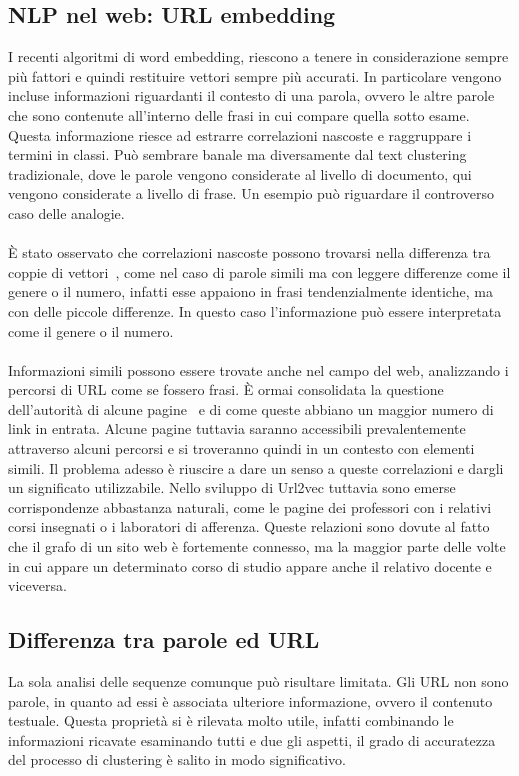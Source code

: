 \subsection{NLP nel web: URL embedding}
I recenti algoritmi di word embedding, riescono a tenere in considerazione sempre più fattori e quindi restituire vettori sempre più accurati. In particolare vengono incluse informazioni riguardanti il contesto di una parola, ovvero le altre parole che sono contenute all'interno delle frasi in cui compare quella sotto esame. Questa informazione riesce ad estrarre correlazioni nascoste e raggruppare i termini in classi. Può sembrare banale ma diversamente dal text clustering tradizionale, dove le parole vengono considerate al livello di documento, qui vengono considerate a livello di frase. Un esempio può riguardare il controverso caso delle analogie. 
\\\\
È stato osservato che correlazioni nascoste possono trovarsi nella differenza tra coppie di vettori~\cite{Mikolov13}, come nel caso di parole simili ma con leggere differenze come il genere o il numero, infatti esse appaiono in frasi tendenzialmente identiche, ma con delle piccole differenze. In questo caso l'informazione può essere interpretata come il genere o il numero.
\\\\
Informazioni simili possono essere trovate anche nel campo del web, analizzando i percorsi di URL come se fossero frasi. È ormai consolidata la questione dell'autorità di alcune pagine~\cite{Kleinberg99}
e di come queste abbiano un maggior numero di link in entrata. Alcune pagine tuttavia saranno accessibili prevalentemente attraverso alcuni percorsi e si troveranno quindi in un contesto con elementi simili. Il problema adesso è riuscire a dare un senso a queste correlazioni e dargli un significato utilizzabile. Nello sviluppo di Url2vec tuttavia sono emerse corrispondenze abbastanza naturali, come le pagine dei professori con i relativi corsi insegnati o i laboratori di afferenza. Queste relazioni sono dovute al fatto che il grafo di un sito web è fortemente connesso, ma la maggior parte delle volte in cui appare un determinato corso di studio appare anche il relativo docente e viceversa. 

\subsection{Differenza tra parole ed URL}
La sola analisi delle sequenze comunque può risultare limitata. Gli URL non sono parole, in quanto ad essi è associata ulteriore informazione, ovvero il contenuto testuale. Questa proprietà si è rilevata molto utile, infatti combinando le informazioni ricavate esaminando tutti e due gli aspetti, il grado di accuratezza del processo di clustering è salito in modo significativo. 

